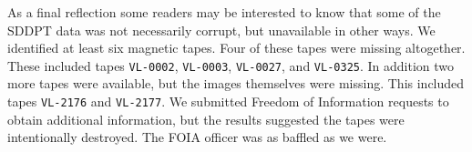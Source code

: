 As a final reflection some readers may be interested to know that some of the SDDPT data was not necessarily corrupt, but unavailable in other ways. We identified at least six magnetic tapes. Four of these tapes were missing altogether. These included tapes {\tt VL-0002}, {\tt VL-0003}, {\tt VL-0027}, and {\tt VL-0325}. In addition two more tapes were available, but the images themselves were missing. This included tapes {\tt VL-2176} and {\tt VL-2177}. We submitted Freedom of Information requests to obtain additional information, but the results suggested the tapes were intentionally destroyed. The FOIA officer was as baffled as we were.

    {}

\StopChapter


